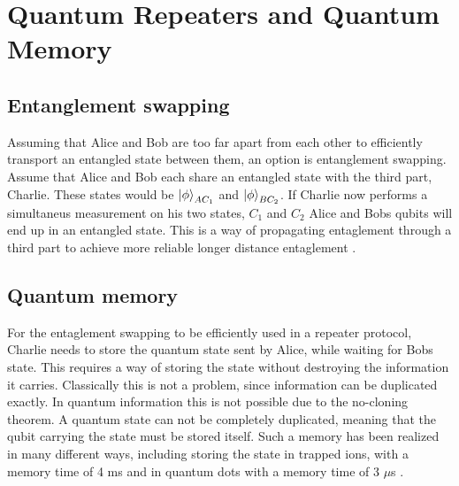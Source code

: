\section{Quantum Repeaters and Quantum Memory}

\subsection{Entanglement swapping}

Assuming that Alice and Bob are too far apart from each other to efficiently transport an entangled state between them,
an option is entanglement swapping. Assume that Alice and Bob each share an entangled state with the third part, Charlie.
These states would be $\ket{\phi}_{AC_1}$ and $\ket{\phi}_{BC_2}$. If Charlie now performs a simultaneus measurement on his two states, $C_1$ and $C_2$
Alice and Bobs qubits will end up in an entangled state. This is a way of propagating entaglement through a third part to achieve more reliable longer distance entaglement \cite{Azuma:2023}.

\subsection{Quantum memory}

For the entaglement swapping to be efficiently used in a repeater protocol, 
Charlie needs to store the quantum state sent by Alice, while waiting for Bobs state. This requires a way of storing the state without destroying the information it carries.
Classically this is not a problem, since information can be duplicated exactly. In quantum information this is not possible due to the no-cloning theorem.
A quantum state can not be completely duplicated, meaning that the qubit carrying the state must be stored itself.
Such a memory has been realized in many different ways, including storing the state in trapped ions, with a memory time of 4 ms \cite{trapped_ion_memory} and in quantum dots with a memory time of 3 $\mu$s \cite{dot_memory}.


